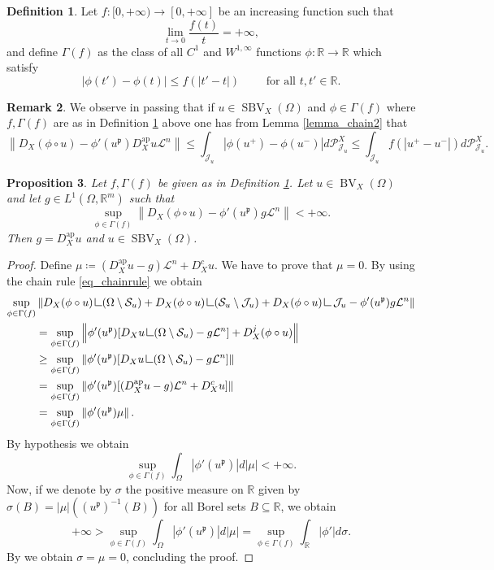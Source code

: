 \documentclass[12pt,a4paper]{amsart}
\theoremstyle{definition}
\newtheorem{defi}{Definition}[section]
\newtheorem{rem}[defi]{Remark}
\theoremstyle{plain}
\newtheorem{pro}[defi]{Proposition}
\newcommand{\R}{\mathbb{R}}
\newcommand{\se}{\subseteq}
\newcommand{\ceq}{\coloneqq}
\newcommand{\pxu}{{\mathcal{P}^X_{\mathcal{J}_u}}}
\newcommand{\res} {\mathop{\hbox{\vrule height 7pt width .5pt depth 0pt \vrule height .5pt width 6pt depth 0pt}}\nolimits}
\newcommand{\leb}{\mathcal{L}}
\newcommand{\sbv}{\operatorname{SBV}}
\newcommand{\bv}{\operatorname{BV}}
\newcommand{\J}{\mathcal{J}}
\newcommand{\nl}{\left\|}
\newcommand{\nr}{\right\|}
\newcommand{\ap}{{\operatorname{ap}}}
\newcommand{\s}{\mathcal{S}}
\newcommand{\p}{{\mathfrak{p}}}
\begin{document}
\begin{defi}\label{def_gammaf}
    Let $f:[0,+\infty) \to [0,+\infty]$ be an increasing function such that 
    \[
    \lim_{t \to 0}\frac{f(t)}{t}=+\infty,
    \]
    and define $\Gamma(f)$ as the class of all $C^1$ and $W^{1,\infty}$ functions $\phi:\R \to \R$ which satisfy
    \[
    |\phi(t')-\phi(t)|\leq f(|t'-t|) \qquad \text{ for all } t,t' \in \R.
    \]
\end{defi}

\begin{rem}\label{rem_ineq}
    We observe in passing that if $u \in \sbv_X(\Omega)$ and $\phi \in \Gamma(f)$ where $f,\Gamma(f)$ are as in Definition \ref{def_gammaf} above one has from Lemma \ref{lemma_chain2} that
    \[
    \nl D_X (\phi \circ u)-\phi'(u^\p)D^\ap_Xu\leb^n  \nr\leq \int_{\J_u}|\phi(u^+)-\phi(u^-)|d \pxu\leq \int_{\J_u} f(|u^+-u^-|)d\pxu.
    \]
\end{rem}


\begin{pro}\label{pro_aux}
    Let $f,\Gamma(f)$ be given as in Definition \ref{def_gammaf}. Let $u \in \bv_X(\Omega)$ and let $g \in L^1(\Omega,\R^m)$ such that
    \[
    \sup_{\phi \in \Gamma(f)}\nl D_X(\phi \circ u)-\phi'(u^\p)g \leb^n \nr <+\infty.
    \]
        Then $g =D_X^\ap u$ and $u \in \sbv_X(\Omega)$.
\end{pro}
\begin{proof}
Define $\mu \ceq (D_X^\ap u-g) \leb^n+D^c_Xu$. We have to prove that $\mu=0$. By using the chain rule \eqref{eq_chainrule} we obtain
\begin{align*}
\sup_{\phi \in \Gamma(f)} &\nl      D_X(\phi \circ u) \res (\Omega \setminus \s_u)+D_X(\phi \circ u) \res (\s_u \setminus \J_u)  +D_X(\phi \circ u) \res \J_u-\phi'(u^\p)g\leb^n       \nr\\
&=\sup_{\phi \in \Gamma(f)}\nl      \phi'(u^\p)[D_X u \res (\Omega \setminus \s_u)-g\leb^n] +D_X^j(\phi \circ u)      \nr\\
& \geq \sup_{\phi \in \Gamma(f)}\nl   \phi'(u^\p) [D_X u \res (\Omega \setminus \s_u)-g\leb^n]   \nr\\
&  = \sup_{\phi \in \Gamma(f)}\nl \phi'(u^\p)   [(D^\ap_Xu-g)\leb^n+D^c_Xu ]           \nr\\
&=\sup_{\phi \in \Gamma(f)}\nl \phi'(u^\p)   \mu\nr.
\end{align*}
By hypothesis we obtain
\[
\sup_{\phi \in \Gamma(f)}\int_\Omega|\phi'(u^\p)|d|\mu|<+\infty.
\]
Now, if we denote by $\sigma$ the positive measure on $\R$ given by $\sigma(B)=|\mu|((u^\p)^{-1}(B))$ for all Borel sets $B \se \R$, we obtain
\[
+\infty>\sup_{\phi \in \Gamma(f)}\int_\Omega|\phi'(u^\p)|d|\mu|=\sup_{\phi \in \Gamma(f)}\int_\R |\phi'|d\sigma.
\]
By \cite[Lemma 2.4]{albertimantegazza} we obtain $\sigma=\mu=0$, concluding the proof.
\end{proof}
\end{document}
